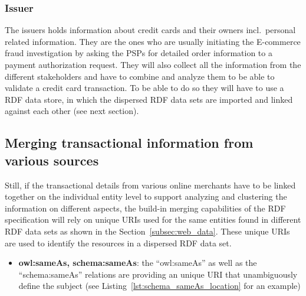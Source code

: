 \subsubsection{Issuer}
\label{subsub:prep_info_issuer}

The issuers holds information about credit cards and their owners incl.\ personal related information. They are the ones who are usually initiating the \gls{E-commerce} fraud investigation by asking the \gls{PSP}s for detailed order information to a payment authorization request. They will also collect all the information from the different stakeholders and have to combine and analyze them to be able to validate a credit card transaction. To be able to do so they will have to use a \gls{RDF} data store, in which the dispersed \gls{RDF} data sets are imported and linked against each other (see next section).

\subsection{Merging transactional information from various sources}
\label{subsec:information_mapping}

Still, if the transactional details from various online merchants have to be linked together on the individual entity level to support analyzing and clustering the information on different aspects, the build-in merging capabilities of the \gls{RDF} specification will rely on unique \gls{URI}s used for the same entities found in different \gls{RDF} data sets as shown in the Section~\ref{subsec:web_data}. These unique \gls{URI}s are used to identify the resources in a dispersed \gls{RDF} data set. \@

\begin{itemize}
	\item \textbf{owl:sameAs, schema:sameAs}: the ``owl:sameAs'' as well as the ``schema:sameAs'' relations are providing an unique \gls{URI} that unambiguously define the subject (see Listing~\ref{lst:schema_sameAs_location} for an example)
\end{itemize}


